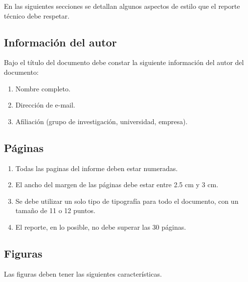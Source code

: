 \documentclass{article}
\begin{document}
En las siguientes secciones se detallan algunos aspectos de estilo que el reporte técnico debe respetar.

\subsection{Información del autor}
\label{sec:autores}

Bajo el título del documento debe constar la siguiente información del autor del documento: 

\begin{enumerate}
 \item Nombre completo.
 \item Dirección de e-mail. 
 \item Afiliación (grupo de investigación, universidad, empresa).
\end{enumerate}
 
\subsection{Páginas}
\label{sec:paginas}

\begin{enumerate}
    
    \item Todas las paginas del informe deben estar numeradas.
    
    \item El ancho del margen de las páginas debe estar entre 2.5 cm y 3 cm.

    \item Se debe utilizar un solo tipo de tipografía para todo el documento, con un tamaño de 11 o 12 puntos.
    
    \item El reporte, en lo posible, no debe superar las 30 páginas.
        
\end{enumerate}
 
\subsection{Figuras}
\label{sec:figuras}

Las figuras deben tener las siguientes características.
\end{document}
